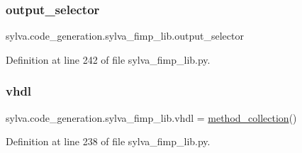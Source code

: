 \subsubsection{\texorpdfstring{output\+\_\+selector}{output\_selector}}
{\footnotesize\ttfamily sylva.\+code\+\_\+generation.\+sylva\+\_\+fimp\+\_\+lib.\+output\+\_\+selector}



Definition at line 242 of file sylva\+\_\+fimp\+\_\+lib.\+py.

\mbox{\label{namespacesylva_1_1code__generation_1_1sylva__fimp__lib_a04e5d8b89872e8bfea99c717c935813a}} 
\subsubsection{\texorpdfstring{vhdl}{vhdl}}
{\footnotesize\ttfamily sylva.\+code\+\_\+generation.\+sylva\+\_\+fimp\+\_\+lib.\+vhdl = \hyperlink{classsylva_1_1code__generation_1_1sylva__fimp__lib_1_1method__collection}{method\+\_\+collection}()}



Definition at line 238 of file sylva\+\_\+fimp\+\_\+lib.\+py.

